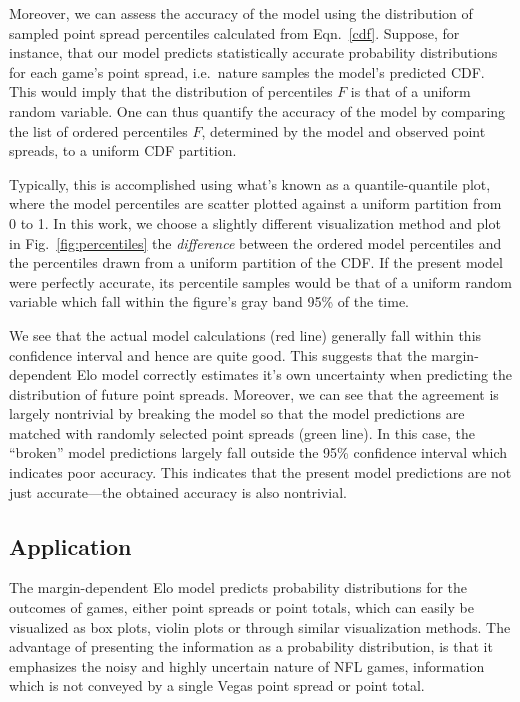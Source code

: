 \documentclass[aps,prc,reprint,amsmath,superscriptaddress,nofootinbib]{revtex4-1}
\begin{document}
Moreover, we can assess the accuracy of the model using the distribution of sampled point spread percentiles calculated from Eqn.~\eqref{cdf}.
Suppose, for instance, that our model predicts statistically accurate probability distributions for each game's point spread, i.e.\ nature samples the model's predicted CDF.
This would imply that the distribution of percentiles $F$ is that of a uniform random variable. 
One can thus quantify the accuracy of the model by comparing the list of ordered percentiles $F$, determined by the model and observed point spreads, to a uniform CDF partition. 

Typically, this is accomplished using what's known as a quantile-quantile plot, where the model percentiles are scatter plotted against a uniform partition from 0 to 1.
In this work, we choose a slightly different visualization method and plot in Fig.~\ref{fig:percentiles} the \emph{difference} between the ordered model percentiles and the percentiles drawn from a uniform partition of the CDF.
If the present model were perfectly accurate, its percentile samples would be that of a uniform random variable which fall within the figure's gray band 95\% of the time.

We see that the actual model calculations (red line) generally fall within this confidence interval and hence are quite good.
This suggests that the margin-dependent Elo model correctly estimates it's own uncertainty when predicting the distribution of future point spreads.
Moreover, we can see that the agreement is largely nontrivial by breaking the model so that the model predictions are matched with randomly selected point spreads (green line).
In this case, the ``broken'' model predictions largely fall outside the 95\% confidence interval which indicates poor accuracy.
This indicates that the present model predictions are not just accurate---the obtained accuracy is also nontrivial.

\subsection{Application}

The margin-dependent Elo model predicts probability distributions for the outcomes of games, either point spreads or point totals, which can easily be visualized as box plots, violin plots or through similar visualization methods.
The advantage of presenting the information as a probability distribution, is that it emphasizes the noisy and highly uncertain nature of NFL games, information which is not conveyed by a single Vegas point spread or point total.
\end{document}
